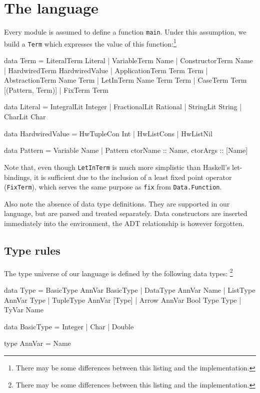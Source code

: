 \documentclass[a4paper]{scrartcl}
\begin{document}
\section{The language}
Every module is assumed to define a function \texttt{main}. Under this
assumption, we build a \texttt{Term} which expresses the value of this
function:\footnote{There may be some differences between this listing and the implementation.}

\begin{code}
data Term = LiteralTerm     Literal
          | VariableTerm    Name
          | ConstructorTerm Name
          | HardwiredTerm   HardwiredValue
          | ApplicationTerm Term Term
          | AbstractionTerm Name Term
          | LetInTerm       Name Term Term
          | CaseTerm        Term [(Pattern, Term)]
          | FixTerm         Term

data Literal = IntegralLit Integer
             | FractionalLit Rational
             | StringLit String
             | CharLit Char

data HardwiredValue = HwTupleCon Int 
                    | HwListCons
                    | HwListNil

data Pattern = Variable Name
             | Pattern {ctorName :: Name, ctorArgs :: [Name]}
\end{code}

Note that, even though \texttt{LetInTerm} is much more simplistic than
Haskell's let-bindings, it is sufficient due to the inclusion of a least
fixed point operator (\texttt{FixTerm}), which serves the same purpose as
\texttt{fix} from \texttt{Data.Function}.

Also note the absence of data type definitions. They are supported in our
language, but are parsed and treated separately. Data constructors are
inserted immediately into the environment, the ADT relationship is however
forgotten.

\subsection{Type rules}
The type universe of our language is defined by the following data types:%
\footnote{There may be some differences between this listing and the implementation.}

\begin{code}
data Type = BasicType AnnVar BasicType
          | DataType AnnVar Name
          | ListType AnnVar Type
          | TupleType AnnVar [Type]
          | Arrow AnnVar Bool Type Type
          | TyVar Name

data BasicType = Integer
               | Char
               | Double

type AnnVar = Name
\end{code}
\end{document}
